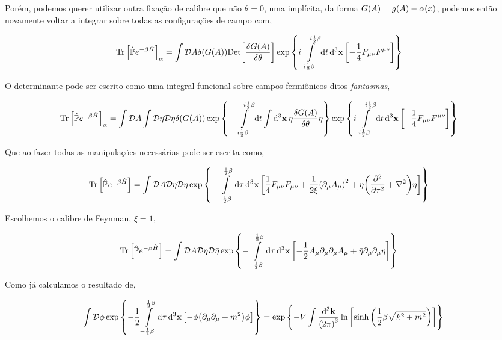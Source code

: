 \documentclass[twoside]{amsart}
\newcommand{\Dd}[1]{\mathcal D #1}
\newcommand{\Det}[1]{\textup{Det} #1}
\numberwithin{equation}{section}
\begin{document}
Porém, podemos querer utilizar outra fixação de calibre que não $\theta=0$, uma implícita, da forma $G\qty(A)=g\qty(A)-\alpha\qty(x)$, podemos então novamente voltar a integrar sobre todas as configurações de campo com,

\begin{align}
    \Tr\qty[\hat{\mathbb P}e^{-\beta\hat H}]_\alpha&=\int\Dd{A}\delta\qty(G\qty(A))\Det\qty[\fdv{G\qty(A)}{\theta}]\exp\qty{i\int\limits_{i\frac12\beta}^{-i\frac12\beta}\dd{t}\dd[3]{\vb x}\qty[-\frac14F_{\mu\nu}F^{\mu\nu}]}
\end{align}

O determinante pode ser escrito como uma integral funcional sobre campos fermiônicos ditos \emph{fantasmas},

\begin{align}
    \Tr\qty[\hat{\mathbb P}e^{-\beta\hat H}]_\alpha&=\int\Dd{A}\int\Dd{\eta}\Dd{\bar\eta}\delta\qty(G\qty(A))\exp\qty{-\int\limits_{i\frac12\beta}^{-i\frac12\beta}\dd{t}\int\dd[3]{\vb x}\bar\eta\fdv{G\qty(A)}{\theta}\eta}\exp\qty{i\int\limits_{i\frac12\beta}^{-i\frac12\beta}\dd{t}\dd[3]{\vb x}\qty[-\frac14F_{\mu\nu}F^{\mu\nu}]}
\end{align}

Que ao fazer todas as manipulações necessárias pode ser escrita como,

\begin{align}
    \Tr\qty[\hat{\mathbb P}e^{-\beta\hat H}]&=\int\Dd{A}\Dd{\eta}\Dd{\bar\eta}\exp\qty{-\int\limits_{-\frac12\beta}^{\frac12\beta}\dd{\tau}\dd[3]{\vb x}\qty[\frac14F_{\mu\nu}F_{\mu\nu}+\frac{1}{2\xi}\qty(\partial_\mu A_\mu)^2+\bar\eta\qty(\pdv[2]{}{\tau}+\laplacian)\eta]}
\end{align}

Escolhemos o calibre de Feynman, $\xi=1$,

\begin{align}
    \Tr\qty[\hat{\mathbb P}e^{-\beta\hat H}]&=\int\Dd{A}\Dd{\eta}\Dd{\bar\eta}\exp\qty{-\int\limits_{-\frac12\beta}^{\frac12\beta}\dd{\tau}\dd[3]{\vb x}\qty[-\frac12A_{\mu}\partial_\mu\partial_\mu A_\mu+\bar\eta\partial_\mu \partial_\mu \eta]}
\end{align}

Como já calculamos o resultado de,

\begin{align}
    \int\Dd{\phi}\exp\qty{-\frac12\int\limits_{-\frac12\beta}^{\frac12\beta}\dd{\tau}\dd[3]{\vb x}\qty[-\phi\qty(\partial_\mu\partial_\mu+m^2)\phi]}=\exp\qty{-V\int\frac{\dd[3]{\vb k}}{\qty(2\pi)^3}\ln\qty[\sinh\qty(\frac12\beta\sqrt{k^2+m^2})]}
\end{align}
\end{document}
